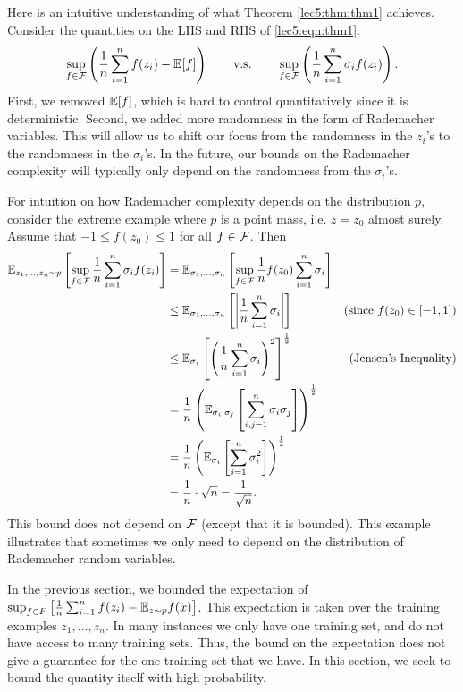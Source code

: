 Here is an intuitive understanding of what Theorem \ref{lec5:thm:thm1} achieves. Consider the quantities on the LHS and RHS of \eqref{lec5:eqn:thm1}:
\begin{align*}
    \sup_{f\in \mathcal F} \left(\frac{1}{n} \sum_{i=1}^n f(z_i) - \mathbb E[f]\right) \qquad \text{v.s.} \qquad \sup_{f\in \mathcal F} \left(\frac{1}{n} \sum_{i=1}^n \sigma_i f(z_i)\right).
\end{align*}
First, we removed $\mathbb E[f]$, which is hard to control quantitatively since it is deterministic. Second, we added more randomness in the form of Rademacher variables. This will allow us to shift our focus from the randomness in the $z_i$'s to the randomness in the $\sigma_i$'s. In the future, our bounds on the Rademacher complexity will typically only depend on the randomness from the $\sigma_i$'s.

For intuition on how Rademacher complexity depends on the distribution $p$, consider the extreme example where $p$ is a point mass, i.e. $z = z_0$ almost surely. Assume that $-1 \leq f(z_0) \leq 1$ for all $f \in \mathcal F$. Then
\begin{align}
    \mathbb E_{z_1, \dots, z_n \sim p} \left[ \sup_{f \in \mathcal F} \frac{1}{n} \sum^n_{i=1} \sigma_i f(z_i)\right]
    &= \mathbb E_{\sigma_1, \dots, \sigma_n} \left[ \sup_{f \in \mathcal F} \frac{1}{n}f(z_0) \sum^n_{i=1} \sigma_i \right] \\
    &\leq \mathbb E_{\sigma_1, \dots, \sigma_n} \left[ \left| \frac{1}{n} \sum^n_{i=1} \sigma_i \right|\right] &(\text{since } f(z_0) \in [-1,1]) \\
    &\leq \mathbb E_{\sigma_i} \left[ \left( \frac{1}{n} \sum^n_{i=1} \sigma_i \right)^2\right]^\frac{1}{2} &(\text{Jensen's Inequality}) \\
    &= \frac{1}{n}\left( \mathbb E_{\sigma_i, \sigma_j} \left[ \sum^n_{i, j=1} \sigma_i\sigma_j \right] \right)^\frac{1}{2}\\
    &= \frac{1}{n}\left( \mathbb E_{\sigma_i} \left[ \sum^n_{i=1} \sigma_i^2 \right] \right)^\frac{1}{2} \\
    &= \frac{1}{n} \cdot \sqrt{n} = \frac{1}{\sqrt{n}}.
\end{align}
This bound does not depend on $\mathcal F$ (except that it is bounded). This example illustrates that sometimes we only need to depend on the distribution of Rademacher random variables.


In the previous section, we bounded the expectation of $\sup_{f\in F} \left[ \frac{1}{n} \sum^n_{i=1} f(z_i) -  \mathbb E_{z\sim p} f(x) \right]$. This expectation is taken over the training examples $z_1, \dots, z_n$. In many instances we only have one training set, and do not have access to many training sets. Thus, the bound on the expectation does not give a guarantee for the one training set that we have. In this section, we seek to bound the quantity itself with high probability.

